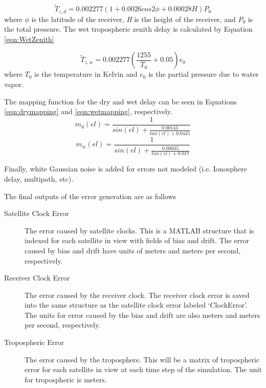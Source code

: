 \documentclass[12pt]{report}
\begin{document}
\begin{equation}
    \tilde{T}_{z,d} = 0.002277(1+0.0026cos2\phi +0.00028H)P_0
    \label{eqn:DryZenith}
\end{equation}
where $\phi$ is the latitude of the receiver, \textit{H} is the height of the receiver, and $P_0$ is the total pressure. 
The wet tropospheric zenith delay is calculated by Equation \ref{eqn:WetZenith} 

\begin{equation}
    \tilde{T}_{z,w} = 0.002277 \left( \frac{1255}{T_0} + 0.05 \right) e_0
    \label{eqn:WetZenith}
\end{equation}
where $T_0$ is the temperature in Kelvin and $e_0$ is the partial pressure due to water vapor.

The mapping function for the dry and wet delay can be seen in Equations \ref{eqn:drymapping} and \ref{eqn:wetmapping}, respectively.
\begin{equation}
    m_d(el) = \frac{1}{sin(el)+\frac{0.00143}{tan(el)+0.0445}}
    \label{eqn:drymapping}
\end{equation}
\begin{equation}
    m_w(el) = \frac{1}{sin(el)+\frac{0.00035}{tan(el)+0.017}}
    \label{eqn:wetmapping}
\end{equation}

Finally, white Gaussian noise is added for errors not modeled (i.e. Ionosphere delay, multipath, etc).

The final outputs of the error generation are as follows
\begin{description}
    \item[Satellite Clock Error] The error caused by satellite clocks. This is a MATLAB structure that is indexed for each satellite in view with fields of bias and drift. The error caused by bias and drift have units of meters and meters per second, respectively.
    \item[Receiver Clock Error] The error caused by the receiver clock. The receiver clock error is saved into the same structure as the satellite clock error labeled `ClockError'. The units for error caused by the bias and drift are also meters and meters per second, respectively.
    \item[Tropospheric Error] The error caused by the troposphere. This will be a matrix of tropospheric error for each satellite in view at each time step of the simulation. The unit for tropospheric is meters.
\end{description}
\end{document}
